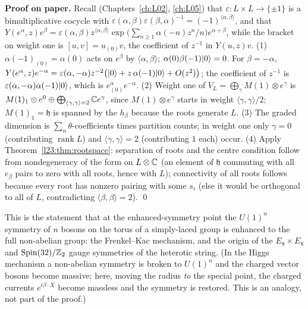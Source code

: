 \textbf{Proof on paper.} Recall (Chapters~\ref{ch:L02}, \ref{ch:L05}) that $\varepsilon:L\times L\to\{\pm1\}$ is a bimultiplicative
cocycle with $\varepsilon(\alpha,\beta)\varepsilon(\beta,\alpha)^{-1}=(-1)^{\langle\alpha,\beta\rangle}$, and that
$Y(e^\alpha,z)e^\beta=\varepsilon(\alpha,\beta)z^{\langle\alpha,\beta\rangle}\exp\big(\sum_{n\ge1}\alpha(-n)z^n/n\big)e^{\alpha+\beta}$, while the
bracket on weight one is $[u,v]=u_{(0)}v$, the coefficient of $z^{-1}$ in $Y(u,z)v$.
(1) $\alpha(-1)_{(0)}=\alpha(0)$ acts on $e^\beta$ by $\langle\alpha,\beta\rangle$; $\alpha(0)\beta(-1)|0\rangle=0$. For $\beta=-\alpha$,
$Y(e^\alpha,z)e^{-\alpha}=\varepsilon(\alpha,-\alpha)z^{-2}\big(|0\rangle+z\,\alpha(-1)|0\rangle+O(z^2)\big)$; the coefficient of $z^{-1}$ is
$\varepsilon(\alpha,-\alpha)\alpha(-1)|0\rangle$, which is $e^\alpha_{(0)}e^{-\alpha}$. (2) Weight one of $V_L=\bigoplus_\gamma
M(1)\otimes e^\gamma$ is $M(1)_1\otimes e^0\oplus\bigoplus_{\langle\gamma,\gamma\rangle=2}{\mathbb{C}} e^\gamma$, since $M(1)\otimes e^\gamma$ starts in
weight $\langle\gamma,\gamma\rangle/2$; $M(1)_1=\mathfrak h$ is spanned by the $h_\beta$ because the roots generate $L$. (3) The graded
dimension is $\sum_n\theta$-coefficients times partition counts; in weight one only $\gamma=0$ (contributing $\operatorname{rank}L$) and
$\langle\gamma,\gamma\rangle=2$ (contributing $1$ each) occur. (4) Apply Theorem~\ref{l23:thm:rootspace}: separation of roots and the centre
condition follow from nondegeneracy of the form on $L\otimes{\mathbb{C}}$ (an element of $\mathfrak h$ commuting with all $e_\beta$ pairs to zero
with all roots, hence with $L$); connectivity of all roots follows because every root has nonzero pairing with some $s_i$ (else it
would be orthogonal to all of $L$, contradicting $\langle\beta,\beta\rangle=2$). \qed

\begin{physics}
This is the statement that at the enhanced-symmetry point the $U(1)^n$ symmetry of $n$ bosons on the torus of a simply-laced group
is enhanced to the full non-abelian group: the Frenkel--Kac mechanism, and the origin of the $E_8\times E_8$ and
$\mathrm{Spin}(32)/{\mathbb{Z}}_2$ gauge symmetries of the heterotic string. (In the Higgs mechanism a non-abelian symmetry is broken to
$U(1)^n$ and the charged vector bosons become massive; here, moving the radius \emph{to} the special point, the charged currents
$e^{i\beta\cdot X}$ become massless and the symmetry is restored. This is an analogy, not part of the proof.)
\end{physics}

